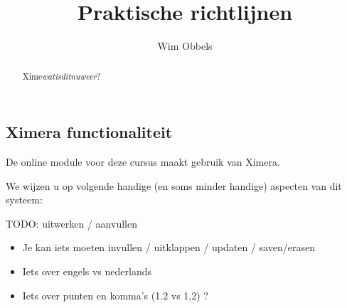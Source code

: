 \documentclass{ximera}
\author{Wim Obbels}
\title{Praktische richtlijnen}
\begin{document}
\begin{abstract}
	Xime\textit{watisditnuweer}?
\end{abstract}
\maketitle

\subsection{Ximera functionaliteit}
De online module voor deze cursus maakt gebruik van Ximera.

We wijzen u op volgende handige (en soms minder handige) aspecten van dit systeem:


TODO: uitwerken / aanvullen


\begin{itemize}
	\item Je kan iets moeten invullen / uitklappen / updaten / saven/erasen

	\item Iets over engels vs nederlands

	\item Iets over punten en komma's  (1.2 vs 1,2) ?

\end{itemize}
\end{document}
